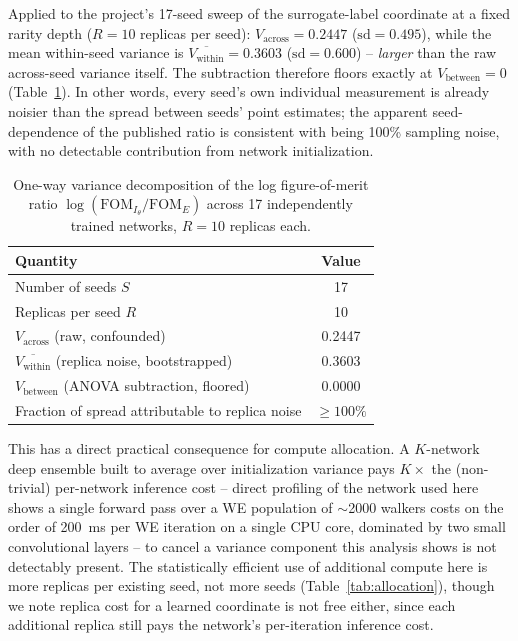 \documentclass[a4paper,fleqn]{cas-sc}
\newcommand{\FOM}{\mathrm{FOM}}
\begin{document}
Applied to the project's 17-seed sweep of the surrogate-label coordinate at
a fixed rarity depth ($R=10$ replicas per seed): $V_{\text{across}} =
0.2447$ ($\mathrm{sd}=0.495$), while the mean within-seed variance is
$\overline{V_{\text{within}}} = 0.3603$ ($\mathrm{sd}=0.600$) --
\emph{larger} than the raw across-seed variance itself. The subtraction
therefore floors exactly at $V_{\text{between}} = 0$ (Table~\ref{tab:anova}).
In other words, every seed's own individual measurement is already noisier
than the spread between seeds' point estimates; the apparent
seed-dependence of the published ratio is consistent with being 100\%
sampling noise, with no detectable contribution from network
initialization.

\begin{table}[h]
\centering
\caption{One-way variance decomposition of the log figure-of-merit ratio
$\log(\FOM_{I_\theta}/\FOM_E)$ across 17 independently trained networks,
$R=10$ replicas each.}
\label{tab:anova}
\begin{tabular}{lc}
\toprule
Quantity & Value \\
\midrule
Number of seeds $S$ & 17 \\
Replicas per seed $R$ & 10 \\
$V_{\text{across}}$ (raw, confounded) & 0.2447 \\
$\overline{V_{\text{within}}}$ (replica noise, bootstrapped) & 0.3603 \\
$V_{\text{between}}$ (ANOVA subtraction, floored) & 0.0000 \\
Fraction of spread attributable to replica noise & $\geq 100\%$ \\
\bottomrule
\end{tabular}
\end{table}

This has a direct practical consequence for compute allocation. A $K$-network
deep ensemble built to average over initialization variance pays $K\times$
the (non-trivial) per-network inference cost -- direct profiling of the
network used here shows a single forward pass over a WE population of
$\sim$2000 walkers costs on the order of 200~ms per WE iteration on a
single CPU core, dominated by two small convolutional layers -- to cancel a
variance component this analysis shows is not detectably present. The
statistically efficient use of additional compute here is more replicas per
existing seed, not more seeds (Table~\ref{tab:allocation}), though we note
replica cost for a learned coordinate is not free either, since each
additional replica still pays the network's per-iteration inference cost.
\end{document}
